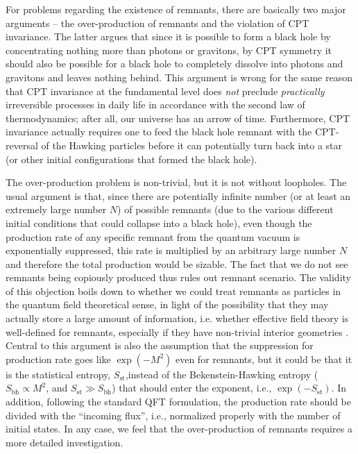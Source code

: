 \documentclass[12pt]{article}
\newcommand{\2}{$^2$}
\newcommand{\3}{$^3$}
\newcommand{\4}{$_4$}
\newcommand{\5}{$_5$}
\begin{document}
For problems regarding the existence of remnants, there are basically two major arguments -- the over-production of remnants and the violation of CPT invariance. The latter argues that since it is possible to form a black hole by concentrating nothing more than photons or gravitons, by CPT symmetry it should also be possible for a black hole to completely dissolve into photons and gravitons and leaves nothing behind. This argument is wrong for the same reason that CPT invariance at the fundamental level does \emph{not} preclude \emph{practically} irreversible processes in daily life in accordance with the second law of thermodynamics; after all, our universe has an arrow of time. Furthermore, CPT invariance actually requires one to feed the black hole remnant with the CPT-reversal of the Hawking particles before it can potentially turn back into a star (or other initial configurations that formed the black hole).

The over-production problem is non-trivial, but it is not without loopholes. The usual argument is that, since there are potentially infinite number (or at least an extremely large number $N$) of possible remnants (due to the various different initial conditions that could collapse into a black hole), even though the production rate of any specific remnant from the quantum vacuum is exponentially suppressed, this rate is multiplied by an arbitrary large number $N$ and therefore the total production would be sizable. The fact that we do not see remnants being copiously produced thus rules out remnant scenario. The validity of this objection boils down to whether we could treat remnants as particles in the quantum field theoretical sense, in light of the possibility that they may actually store a large amount of information, i.e. whether effective field theory is well-defined for remnants, especially if they have non-trivial interior geometries \cite{sabine}. Central to this argument is also the assumption that the suppression for production rate goes like $\exp(-M^2)$ even for remnants, but it could be that it is the statistical entropy, $S_{\text{st}}$,instead of the Bekenstein-Hawking entropy ($S_{\text{bh}} \propto M^2$, and $S_{\text{st}} \gg S_{\text{bh}}$) that should enter the exponent, i.e., $\exp(-S_{\text{st}})$. In addition, following the standard QFT formulation, the production rate should be divided with the ``incoming flux'', i.e., normalized properly with the number of initial states.
In any case, we feel that the over-production of remnants requires a more detailed investigation.
\end{document}
